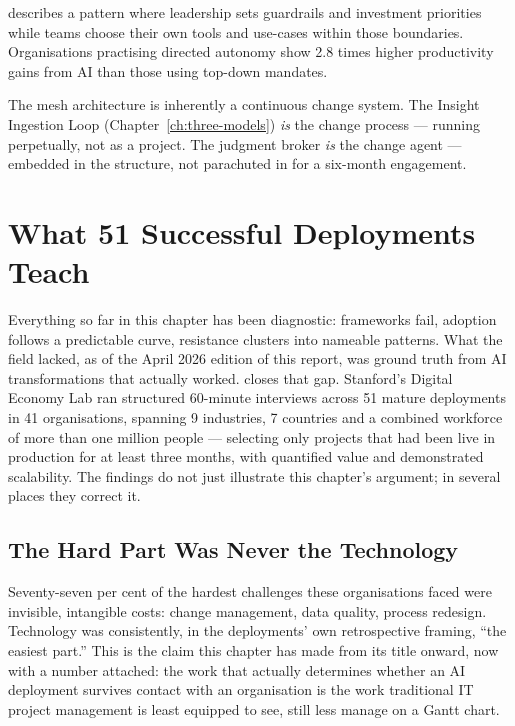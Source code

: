 \textcite{MicrosoftDirectedAutonomy2025} describes a pattern where leadership sets guardrails and investment priorities while teams choose their own tools and use-cases within those boundaries. Organisations practising directed autonomy show 2.8 times higher productivity gains from AI than those using top-down mandates.

\begin{keyinsight}
The mesh architecture is inherently a continuous change system. The Insight Ingestion Loop (Chapter~\ref{ch:three-models}) \emph{is} the change process --- running perpetually, not as a project. The judgment broker \emph{is} the change agent --- embedded in the structure, not parachuted in for a six-month engagement.
\end{keyinsight}

\section{What 51 Successful Deployments Teach}

Everything so far in this chapter has been diagnostic: frameworks fail, adoption follows a predictable curve, resistance clusters into nameable patterns. What the field lacked, as of the April 2026 edition of this report, was ground truth from AI transformations that actually worked. \textcite{Pereira2026Playbook} closes that gap. Stanford's Digital Economy Lab ran structured 60-minute interviews across 51 mature deployments in 41 organisations, spanning 9 industries, 7 countries and a combined workforce of more than one million people --- selecting only projects that had been live in production for at least three months, with quantified value and demonstrated scalability. The findings do not just illustrate this chapter's argument; in several places they correct it.

\subsection{The Hard Part Was Never the Technology}

Seventy-seven per cent of the hardest challenges these organisations faced were invisible, intangible costs: change management, data quality, process redesign. Technology was consistently, in the deployments' own retrospective framing, ``the easiest part.'' This is the claim this chapter has made from its title onward, now with a number attached: the work that actually determines whether an AI deployment survives contact with an organisation is the work traditional IT project management is least equipped to see, still less manage on a Gantt chart.

